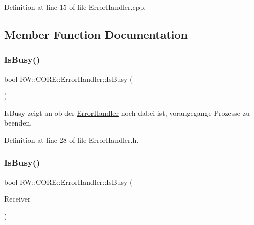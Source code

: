 Definition at line 15 of file Error\+Handler.\+cpp.



\subsection{Member Function Documentation}
\hypertarget{class_r_w_1_1_c_o_r_e_1_1_error_handler_a63b57c30d5d7b4b2ce7c0b65ee64e627}{}\label{class_r_w_1_1_c_o_r_e_1_1_error_handler_a63b57c30d5d7b4b2ce7c0b65ee64e627} 
\subsubsection{\texorpdfstring{Is\+Busy()}{IsBusy()}\hspace{0.1cm}{\footnotesize\ttfamily [1/2]}}
{\footnotesize\ttfamily bool R\+W\+::\+C\+O\+R\+E\+::\+Error\+Handler\+::\+Is\+Busy (\begin{DoxyParamCaption}{ }\end{DoxyParamCaption})\hspace{0.3cm}{\ttfamily [inline]}}



Is\+Busy zeigt an ob der \hyperlink{class_r_w_1_1_c_o_r_e_1_1_error_handler}{Error\+Handler} noch dabei ist, vorangegange Prozesse zu beenden. 



Definition at line 28 of file Error\+Handler.\+h.

\hypertarget{class_r_w_1_1_c_o_r_e_1_1_error_handler_a43a98f148cdb6b07775e2e44a631b411}{}\label{class_r_w_1_1_c_o_r_e_1_1_error_handler_a43a98f148cdb6b07775e2e44a631b411} 
\subsubsection{\texorpdfstring{Is\+Busy()}{IsBusy()}\hspace{0.1cm}{\footnotesize\ttfamily [2/2]}}
{\footnotesize\ttfamily bool R\+W\+::\+C\+O\+R\+E\+::\+Error\+Handler\+::\+Is\+Busy (\begin{DoxyParamCaption}\item[{Util\+::\+Message\+Receiver}]{Receiver }\end{DoxyParamCaption})\hspace{0.3cm}{\ttfamily [inline]}}




